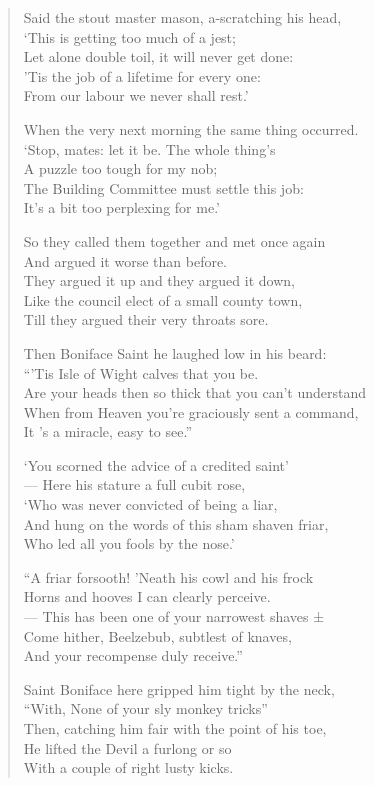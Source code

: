 \documentclass[
  12pt,
  a5paper,
  twoside]{book}
\begin{document}
\begin{quote}
Said the stout master mason, a-scratching his head,\\
`This is getting too much of a jest;\\
Let alone double toil, it will never get done:\\
'Tis the job of a lifetime for every one:\\
From our labour we never shall rest.'

When the very next morning the same thing occurred.\\
`Stop, mates: let it be. The whole thing's\\
A puzzle too tough for my nob;\\
The Building Committee must settle this job:\\
It's a bit too perplexing for me.'

So they called them together and met once again\\
And argued it worse than before.\\
They argued it up and they argued it down,\\
Like the council elect of a small county town,\\
Till they argued their very throats sore.

Then Boniface Saint he laughed low in his beard:\\
``'Tis Isle of Wight calves that you be.\\
Are your heads then so thick that you can't understand\\
When from Heaven you're graciously sent a command,\\
It 's a miracle, easy to see.''

`You scorned the advice of a credited saint'\\
--- Here his stature a full cubit rose,\\
`Who was never convicted of being a liar,\\
And hung on the words of this sham shaven friar,\\
Who led all you fools by the nose.'

``A friar forsooth! 'Neath his cowl and his frock\\
Horns and hooves I can clearly perceive.\\
--- This has been one of your narrowest shaves ±\\
Come hither, Beelzebub, subtlest of knaves,\\
And your recompense duly receive.''

Saint Boniface here gripped him tight by the neck,\\
``With, None of your sly monkey tricks''\\
Then, catching him fair with the point of his toe,\\
He lifted the Devil a furlong or so\\
With a couple of right lusty kicks.
\end{quote}
\end{document}
